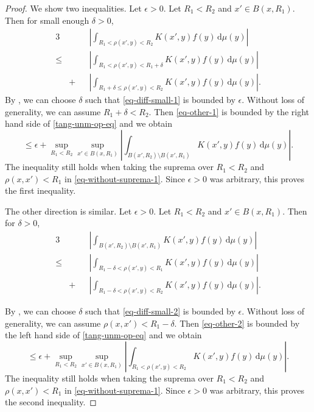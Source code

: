 \begin{proof}
We show two inequalities. Let $\epsilon>0$.
Let $R_1<R_2$ and $x'\in B(x,R_1)$. Then for small enough $\delta>0$,
\begin{alignat}{3}
    \label{eq-without-suprema-1}
    &&&\left|\int_{R_1<\rho(x',y)<R_2} K(x',y) f(y) \, \mathrm{d}\mu(y) \right| \\
    \label{eq-diff-small-1}
    \le &&&\left|\int_{R_1<\rho(x',y)<R_1+\delta} K(x',y) f(y) \, \mathrm{d}\mu(y) \right| \\
    \label{eq-other-1}
    &+&&\left|\int_{R_1+\delta\le\rho(x',y)<R_2} K(x',y) f(y) \, \mathrm{d}\mu(y) \right| .
\end{alignat}
By , we can choose $\delta$ such that \eqref{eq-diff-small-1} is bounded by $\epsilon$. Without loss of generality, we can assume $R_1+\delta<R_2$. Then \eqref{eq-other-1} is bounded by the right hand side of \eqref{tang-unm-op-eq} and we obtain
\begin{equation*}
    \le \epsilon + \sup_{R_1 < R_2} \sup_{x'\in B(x,R_1)} \left|\int_{B(x',R_2)\setminus B(x',R_1)} K(x',y) f(y) \, \mathrm{d}\mu(y) \right| .
\end{equation*}
The inequality still holds when taking the suprema over $R_1<R_2$ and $\rho(x,x')<R_1$ in \eqref{eq-without-suprema-1}. Since $\epsilon>0$ was arbitrary, this proves the first inequality.

The other direction is similar. Let $\epsilon>0$.
Let $R_1<R_2$ and $x'\in B(x,R_1)$. Then for $\delta>0$,
\begin{alignat}{3}
    \label{eq-without-suprema-2}
    &&&\left|\int_{B(x',R_2)\setminus B(x',R_1)} K(x',y) f(y) \, \mathrm{d}\mu(y) \right| \\
    \label{eq-diff-small-2}
    \le &&&\left|\int_{R_1-\delta<\rho(x',y)< R_1} K(x',y) f(y) \, \mathrm{d}\mu(y) \right| \\
    \label{eq-other-2}
    &+&&\left|\int_{R_1-\delta<\rho(x',y)<R_2} K(x',y) f(y) \, \mathrm{d}\mu(y) \right| .
\end{alignat}

By , we can choose $\delta$ such that \eqref{eq-diff-small-2} is bounded by $\epsilon$. Without loss of generality, we can assume $\rho(x,x')<R_1-\delta$. Then \eqref{eq-other-2} is bounded by the left hand side of \eqref{tang-unm-op-eq} and we obtain
\begin{equation*}
    \le \epsilon + \sup_{R_1 < R_2} \sup_{x'\in B(x,R_1)} \left|\int_{R_1<\rho(x',y)<R_2} K(x',y) f(y) \, \mathrm{d}\mu(y) \right| .
\end{equation*}
The inequality still holds when taking the suprema over $R_1<R_2$ and $\rho(x,x')<R_1$ in \eqref{eq-without-suprema-1}. Since $\epsilon>0$ was arbitrary, this proves the second inequality.
\end{proof}

